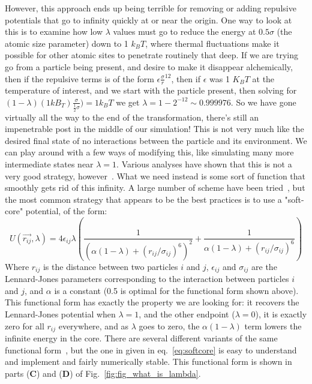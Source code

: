 \documentclass[9pt,bestpractices]{livecoms}
\begin{document}
%
However, this approach ends up being terrible for removing or adding repulsive potentials that go to infinity quickly at or near the origin. One way to look at this is to examine how low $\lambda$ values must go to reduce the energy at $0.5\sigma$ (the atomic size parameter) down to 1 $k_BT$, where thermal fluctuations make it possible for other atomic sites to penetrate routinely that deep. If we are trying go from a particle being present, and desire to make it disappear alchemically, then if the repulsive terms is of the form $\epsilon\frac{\sigma}{r}^{12}$, then if $\epsilon$ was 1 $K_BT$ at the temperature of interest, and we start with the particle present, then solving for $(1-\lambda)(1 kB_T)\frac{\sigma}{\frac{1}{2}\sigma}) = 1 k_B T$ we get $\lambda = 1-2^{-12} \sim 0.999976$. So we have gone virtually all the way to the end of the transformation, there's still an impenetrable post in the middle of our simulation! This is not very much like the desired final state of no interactions between the particle and its environment. We can play around with a few ways of modifying this, like simulating many more intermediate states near $\lambda=1$. Various analyses have shown that this is not a very good strategy, however~\cite{pham2011identifying, beutler1994avoiding, zacharias1994separationshifted, blondel2004ensemble, gapsys2012new}.
%
What we need instead is some sort of function that smoothly gets rid of this infinity. A large number of scheme have been tried~\cite{beutler1994avoiding, zacharias1994separationshifted, blondel2004ensemble, pham2011identifying, pham2012optimal, naden2014linear, donnini2005molecular}, but the most common strategy that appears to be the best practices is to use a "soft-core" potential, of the form:
%
\begin{equation}
    U(\vec{r_{ij}},\lambda) = 4\epsilon_{ij} \lambda \left(\frac{1}{(\alpha(1-\lambda) + (r_{ij}/\sigma_{ij})^6)^2} +  \frac{1}{\alpha(1-\lambda) + (r_{ij}/\sigma_{ij})^6}\right)
    \label{eq:softcore}
\end{equation}
Where $r_{ij}$ is the distance between two particles $i$ and $j$, $\epsilon_{ij}$ and $\sigma_{ij}$ are the Lennard-Jones parameters corresponding to the interaction between particles $i$ and $j$, and $\alpha$ is a constant (0.5 is optimal for the functional form shown above).  This functional form has exactly the property we are looking for: it recovers the Lennard-Jones potential when $\lambda=1$, and the other endpoint ($\lambda=0$), it is exactly zero for all $r_{ij}$ everywhere, and as $\lambda$ goes to zero, the  $\alpha(1-\lambda)$ term lowers the infinite energy in the core.  There are several different variants of the same functional form~\cite{zacharias1994separationshifted, beutler1994avoiding,pham2011identifying}, but the one in given in eq.~\ref{eq:softcore} is easy to understand and implement and fairly numerically stable. This functional form is shown in parts (\textbf{C}) and (\textbf{D}) of Fig.~\ref{fig:fig_what_is_lambda}.
\end{document}
